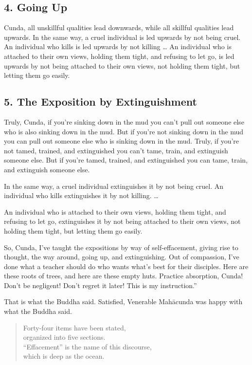 \documentclass[12pt,openany]{book}%
\begin{document}
\subsection*{4. Going Up }

Cunda, all unskillful qualities lead downwards, while all skillful qualities lead upwards. In the same way, a cruel individual is led upwards by not being cruel. An individual who kills is led upwards by not killing … An individual who is attached to their own views, holding them tight, and refusing to let go, is led upwards by not being attached to their own views, not holding them tight, but letting them go easily. 

\subsection*{5. The Exposition by Extinguishment }

Truly, Cunda, if you’re sinking down in the mud you can’t pull out someone else who is also sinking down in the mud. But if you’re not sinking down in the mud you can pull out someone else who is sinking down in the mud. Truly, if you’re not tamed, trained, and extinguished you can’t tame, train, and extinguish someone else. But if you’re tamed, trained, and extinguished you can tame, train, and extinguish someone else. 

In the same way, a cruel individual extinguishes it by not being cruel. An individual who kills extinguishes it by not killing. … 

An individual who is attached to their own views, holding them tight, and refusing to let go, extinguishes it by not being attached to their own views, not holding them tight, but letting them go easily. 

So, Cunda, I’ve taught the expositions by way of self-effacement, giving rise to thought, the way around, going up, and extinguishing. Out of compassion, I’ve done what a teacher should do who wants what’s best for their disciples. Here are these roots of trees, and here are these empty huts. Practice absorption, Cunda! Don’t be negligent! Don’t regret it later! This is my instruction.” 

That is what the Buddha said. Satisfied, Venerable \textsanskrit{Mahācunda} was happy with what the Buddha said. 

\begin{verse}%
Forty-four items have been stated, \\
organized into five sections. \\
“Effacement” is the name of this discourse, \\
which is deep as the ocean. 

%
\end{verse}
\end{document}
